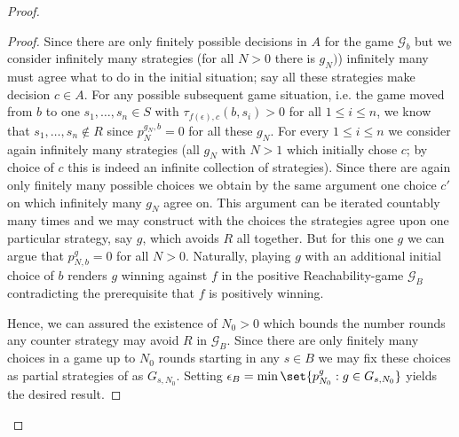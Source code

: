 \begin{proof}
\begin{proof}
    Since there are only finitely possible decisions in $A$ for the game 
    $\mathcal{G}_{b}$ but we consider infinitely many strategies (for all $N>0$ 
    there is $g_{N})$) infinitely many must agree what to do in the initial 
    situation; say all these strategies make decision $c\in A$. For any 
    possible subsequent game situation, i.e. the game moved from $b$ to 
    one $s_{1},\dots, s_{n}\in S$ with $\tau_{f(\epsilon), c}(b, s_{i}) > 0$ 
    for all $1\leq i\leq n$, we know that $s_{1},\dots, s_{n}\not\in R$ since
    $p_{N}^{g_{N}, b} = 0$ for all these $g_{N}$. For every $1\leq i\leq n$ we 
    consider again infinitely many strategies (all $g_{N}$ with $N>1$ which 
    initially chose $c$; by choice of $c$ this is indeed an infinite collection
    of strategies). Since there are again only finitely many possible choices 
    we obtain by the same argument one choice $c'$ on which infinitely many 
    $g_{N}$ agree on. This argument can be iterated countably many times and we 
    may construct with the choices the strategies agree upon one particular 
    strategy, say $g$, which avoids $R$ all together. But for this one $g$ we
    can argue that $p_{N, b}^{g} = 0$ for all $N>0$. Naturally, playing $g$ 
    with an additional initial choice of $b$ renders $g$ winning against $f$ in
    the positive Reachability-game $\mathcal{G}_{B}$ contradicting the 
    prerequisite that $f$ is positively winning.

    Hence, we can assured the existence of $N_{0} > 0$ which bounds the number
    rounds any counter strategy may avoid $R$ in $\mathcal{G}_{B}$. Since there
    are only finitely many choices in a game up to $N_{0}$ rounds starting in
    any $s\in B$ we may fix these choices as partial strategies of \adam{} as
    $G_{s,N_{0}}$. Setting 
    $\epsilon_{B} = \min\set{p^{g}_{N_{0}}:g\in G_{s, N_{0}}}$ yields the 
    desired result.
  \end{proof}
\end{proof}

